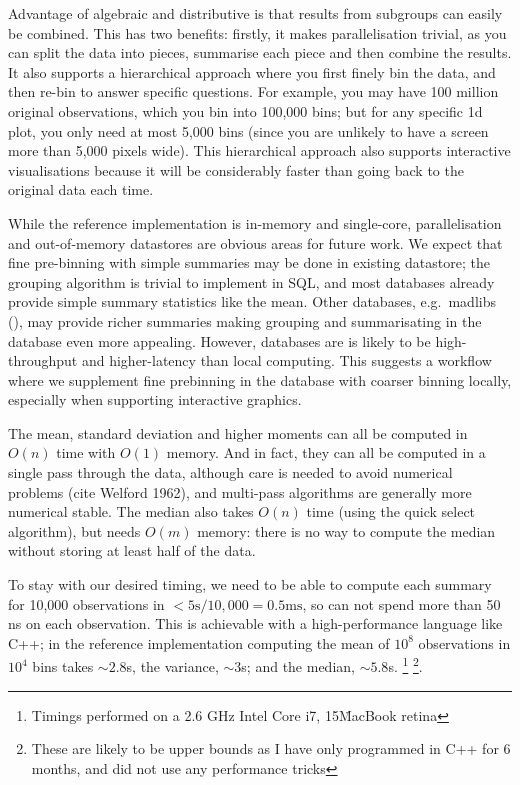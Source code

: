 \documentclass[journal]{vgtc}                %
\begin{document}
Advantage of algebraic and distributive is that results from subgroups can easily be combined. This has two benefits: firstly, it makes parallelisation trivial, as you can split the data into pieces, summarise each piece and then combine the results. It also supports a hierarchical approach where you first finely bin the data, and then re-bin to answer specific questions. For example, you may have 100 million original observations, which you bin into 100,000 bins; but for any specific 1d plot, you only need at most 5,000 bins (since you are unlikely to have a screen more than 5,000 pixels wide). This hierarchical approach also supports interactive visualisations because it will be considerably faster than going back to the original data each time.

While the reference implementation is in-memory and single-core, parallelisation and out-of-memory datastores are obvious areas for  future work. We expect that fine pre-binning with simple summaries may be done in existing datastore; the grouping algorithm is trivial to implement in SQL, and most databases already provide simple summary statistics like the mean. Other databases, e.g.\ madlibs (), may provide richer summaries making grouping and summarisating in the database even more appealing. However, databases are is likely to be high-throughput and higher-latency than local computing. This suggests a workflow where we supplement fine prebinning in the database with coarser binning locally, especially when supporting interactive graphics.

The mean, standard deviation and higher moments can all be computed in $O(n)$ time with $O(1)$ memory. And in fact, they can all be computed in a single pass through the data, although care is needed to avoid numerical problems (cite Welford 1962), and multi-pass algorithms are generally more numerical stable. The median also takes $O(n)$ time (using the quick select algorithm), but needs $O(m)$ memory: there is no way to compute the median without storing at least half of the data.

To stay with our desired timing, we need to be able to compute each summary for 10,000 observations in $< 5 \mbox{s} / 10,000 = 0.5 \mbox{ms}$, so can not spend more than 50 ns on each observation. This is achievable with a high-performance language like C++; in the reference implementation computing the mean of $10^8$ observations in $10^4$ bins takes $\sim 2.8$s, the variance, $\sim 3$s; and the median, $\sim 5.8$s. \footnote{Timings performed on a 2.6 GHz Intel Core i7, 15\" MacBook retina} \footnote{These are likely to be upper bounds as I have only programmed in C++ for 6 months, and did not use any performance tricks}.  
\end{document}
